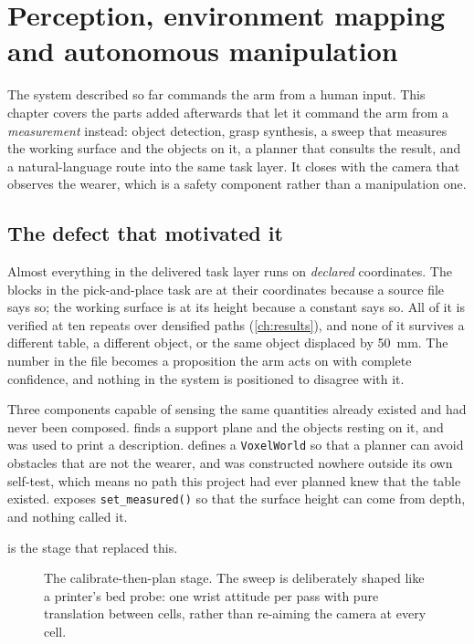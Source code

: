 \chapter{Perception, environment mapping and autonomous manipulation}
\label{ch:perception}

The system described so far commands the arm from a human input. This chapter
covers the parts added afterwards that let it command the arm from a
\emph{measurement} instead: object detection, grasp synthesis, a sweep that
measures the working surface and the objects on it, a planner that consults
the result, and a natural-language route into the same task layer. It closes
with the camera that observes the wearer, which is a safety component rather
than a manipulation one.

\section{The defect that motivated it}

Almost everything in the delivered task layer runs on \emph{declared}
coordinates. The blocks in the pick-and-place task are at their coordinates
because a source file says so; the working surface is at its height because a
constant says so. All of it is verified at ten repeats over densified paths
(\cref{ch:results}), and none of it survives a different table, a different
object, or the same object displaced by \SI{50}{\milli\metre}. The number in
the file becomes a proposition the arm acts on with complete confidence, and
nothing in the system is positioned to disagree with it.

Three components capable of sensing the same quantities already existed and
had never been composed.  finds a
support plane and the objects resting on it, and was used to print a
description.  defines a
\texttt{VoxelWorld} so that a planner can avoid obstacles that are not the
wearer, and was constructed nowhere outside its own self-test, which means no
path this project had ever planned knew that the table existed.
 exposes \texttt{set\_measured()} so
that the surface height can come from depth, and nothing called it.

 is the stage that replaced this.

\begin{figure}[htbp]
  \centering
  
  \caption[Measure, then plan]{The calibrate-then-plan stage. The sweep is
  deliberately shaped like a printer's bed probe: one wrist attitude per pass
  with pure translation between cells, rather than re-aiming the camera at
  every cell.}
  \label{fig:perception-pipeline}
\end{figure}

